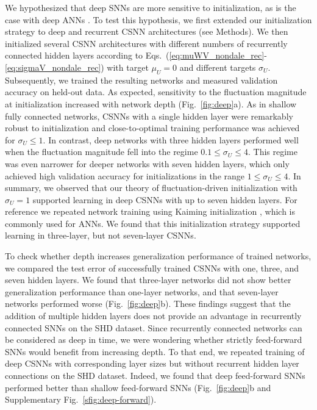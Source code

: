 \documentclass[11pt,a4paper]{article}
\begin{document}
We hypothesized that deep \acp{SNN} are more sensitive to initialization, as is the case with deep \acp{ANN} \citep{He2015-kv}. 
To test this hypothesis, we first extended our initialization strategy to deep and recurrent \ac{CSNN} architectures (see Methods).
We then initialized several \ac{CSNN} architectures with different numbers of recurrently connected hidden layers according to \mbox{Eqs.~(\ref{eq:muWV_nondale_rec}-\ref{eq:sigmaV_nondale_rec})} with target $\mu_U=0$ and different targets $\sigma_U$.
Subsequently, we trained the resulting networks and measured validation accuracy on held-out data.
As expected, sensitivity to the fluctuation magnitude at initialization increased with network depth (Fig.~\ref{fig:deep}a). 
As in shallow fully connected networks, \acp{CSNN} with a single hidden layer were remarkably robust to initialization and close-to-optimal training performance was achieved for $\sigma_U \leq 1$. 
In contrast, deep networks with three hidden layers performed well when the fluctuation magnitude fell into the regime \mbox{$0.1 \leq \sigma_U \leq 4$}. 
This regime was even narrower for deeper networks with seven hidden layers, which only achieved high validation accuracy for initializations in the range $1 \leq \sigma_U \leq 4$.
In summary, we observed that our theory of fluctuation-driven initialization with $\sigma_U = 1$ supported learning in deep \acp{CSNN} with up to seven hidden layers. 
For reference we repeated network training using Kaiming initialization \cite{He2015-kv}, which is commonly used for \acp{ANN}.
We found that this initialization strategy supported learning in three-layer, but not seven-layer \acp{CSNN}.

To check whether depth increases generalization performance of trained networks, we compared the test error of successfully trained \acp{CSNN} with one, three, and seven hidden layers.
We found that three-layer networks did not show better generalization performance than one-layer networks, and that seven-layer networks performed worse (Fig.~\ref{fig:deep}b).
These findings suggest that the addition of multiple hidden layers does not provide an advantage in recurrently connected \acp{SNN} on the SHD dataset.
Since recurrently connected networks can be considered as deep in time, we were wondering whether strictly feed-forward  \acp{SNN} would benefit from increasing depth.
To that end, we repeated training of deep \acp{CSNN} with corresponding layer sizes but without recurrent hidden layer connections on the SHD dataset.
Indeed, we found that deep feed-forward \acp{SNN} performed better than shallow feed-forward \acp{SNN} (Fig.~\ref{fig:deep}b and Supplementary Fig.~\ref{sfig:deep-forward}).
\end{document}
